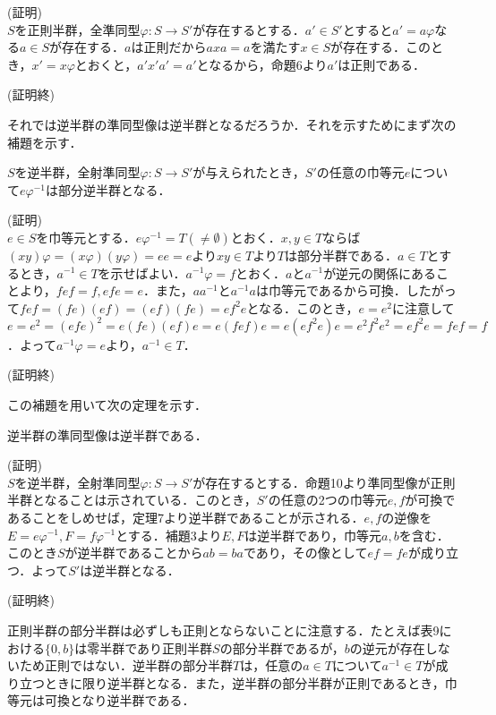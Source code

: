 (証明)\\
$S$を正則半群，全準同型$\varphi:S\rightarrow S'$が存在するとする．$a'\in S'$とすると$a'=a\varphi$なる$a\in S$が存在する．$a$は正則だから$axa=a$を満たす$x\in S$が存在する．このとき，$x'=x\varphi$とおくと，$a'x'a'=a'$となるから，命題6より$a'$は正則である．
\begin{flushright}
(証明終)
\end{flushright}
それでは逆半群の準同型像は逆半群となるだろうか．それを示すためにまず次の補題を示す．
\begin{slem}
$S$を逆半群，全射準同型$\varphi:S\rightarrow S'$が与えられたとき，$S'$の任意の巾等元$e$について$e\varphi^{-1}$は部分逆半群となる．
\end{slem}
(証明)\\
$e\in S$を巾等元とする．$e\varphi^{-1}=T(\neq\emptyset)$とおく．$x,y\in T$ならば$(xy)\varphi=(x\varphi)(y\varphi)=ee=e$より$xy\in T$より$T$は部分半群である．$a\in T$とするとき，$a^{-1}\in T$を示せばよい．$a^{-1}\varphi=f$とおく．$a$と$a^{-1}$が逆元の関係にあることより，$fef=f,efe=e$．また，$aa^{-1}$と$a^{-1}a$は巾等元であるから可換．したがって$fef=(fe)(ef)=(ef)(fe)=ef^2e$となる．このとき，$e=e^2$に注意して$e=e^2=(efe)^2=e(fe)(ef)e=e(fef)e=e(ef^2e)e=e^2f^2e^2=ef^2e=fef=f$．よって$a^{-1}\varphi=e$より，$a^{-1}\in T$．
\begin{flushright}
(証明終)
\end{flushright}
この補題を用いて次の定理を示す．
\begin{sthm}
逆半群の準同型像は逆半群である．
\end{sthm}
(証明)\\
$S$を逆半群，全射準同型$\varphi:S\rightarrow S'$が存在するとする．命題10より準同型像が正則半群となることは示されている．このとき，$S'$の任意の2つの巾等元$e,f$が可換であることをしめせば，定理7より逆半群であることが示される．$e,f$の逆像を$E=e\varphi^{-1},F=f\varphi^{-1}$とする．補題3より$E,F$は逆半群であり，巾等元$a,b$を含む．このとき$S$が逆半群であることから$ab=ba$であり，その像として$ef=fe$が成り立つ．よって$S'$は逆半群となる．
\begin{flushright}
(証明終)
\end{flushright}
正則半群の部分半群は必ずしも正則とならないことに注意する．たとえば表9における$\{0,b\}$は零半群であり正則半群$S$の部分半群であるが，$b$の逆元が存在しないため正則ではない．逆半群の部分半群$T$は，任意の$a\in T$について$a^{-1}\in T$が成り立つときに限り逆半群となる．また，逆半群の部分半群が正則であるとき，巾等元は可換となり逆半群である．\\
